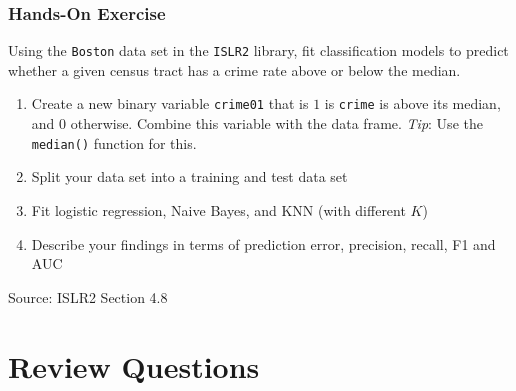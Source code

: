 \begin{tcolorbox}[colback=code]
\subsubsection*{Hands-On Exercise} 
Using the \texttt{Boston} data set in the \texttt{ISLR2} library, fit classification models to predict whether a given census tract has a crime rate above or below the median.
\begin{enumerate}
   \item Create a new binary variable \texttt{crime01} that is $1$ is \texttt{crime} is above its median, and $0$ otherwise. Combine this variable with the data frame. \emph{Tip}: Use the \texttt{median()} function for this.
   \item Split your data set into a training and test data set
   \item Fit logistic regression, Naive Bayes, and KNN (with different $K$)
   \item Describe your findings in terms of prediction error, precision, recall, F1 and AUC
\end{enumerate}
{\footnotesize \vspace{\baselineskip} Source: ISLR2 Section 4.8}
\end{tcolorbox}

\section{Review Questions}

